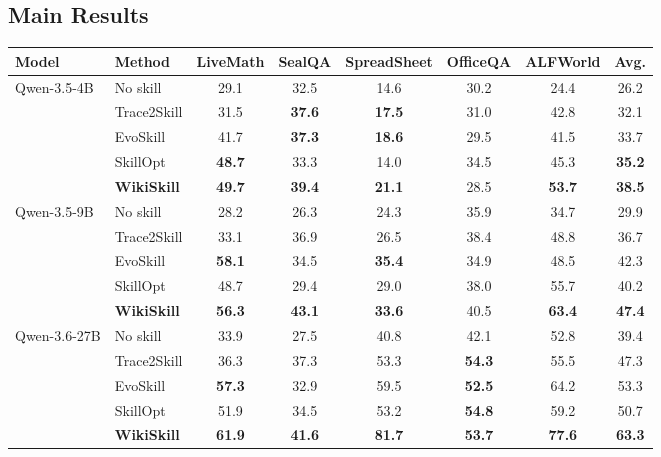 \documentclass[11pt, a4paper, copyright, gr]{google}
\newcommand{\methodcolor}[1]{\cellcolor[HTML]{FDE293}#1}
\begin{document}
\subsection{Main Results}
\label{sec:results}

\begin{table}[t]
\centering
\small
\renewcommand{\tabcolsep}{1.8mm}
\begin{tabular}{llccccc|c}
\toprule
\textbf{Model} & \textbf{Method} & \textbf{LiveMath} & \textbf{SealQA} & \textbf{SpreadSheet} & \textbf{OfficeQA} & \textbf{ALFWorld} & \textbf{Avg.} \\
\midrule
\multirow{5}{*}{Qwen-3.5-4B} & No skill & 29.1 & 32.5 & 14.6 & 30.2 & 24.4 & 26.2 \\
 & Trace2Skill & 31.5 & \textbf{37.6} & \textbf{17.5} & 31.0 & 42.8 & 32.1 \\
 & EvoSkill & 41.7 & \textbf{37.3} & \textbf{18.6} & 29.5 & 41.5 & 33.7 \\
 & SkillOpt & \textbf{48.7} & 33.3 & 14.0 & 34.5 & 45.3 & \textbf{35.2} \\
 & \methodcolor{\textbf{WikiSkill}} & \methodcolor{\textbf{49.7}} & \methodcolor{\textbf{39.4}} & \methodcolor{\textbf{21.1}} & \methodcolor{28.5} & \methodcolor{\textbf{53.7}} & \methodcolor{\textbf{38.5}} \\
\midrule
\multirow{5}{*}{Qwen-3.5-9B} & No skill & 28.2 & 26.3 & 24.3 & 35.9 & 34.7 & 29.9 \\
 & Trace2Skill & 33.1 & 36.9 & 26.5 & 38.4 & 48.8 & 36.7 \\
 & EvoSkill & \textbf{58.1} & 34.5 & \textbf{35.4} & 34.9 & 48.5 & 42.3 \\
 & SkillOpt & 48.7 & 29.4 & 29.0 & 38.0 & 55.7 & 40.2 \\
 & \methodcolor{\textbf{WikiSkill}} & \methodcolor{\textbf{56.3}} & \methodcolor{\textbf{43.1}} & \methodcolor{\textbf{33.6}} & \methodcolor{40.5} & \methodcolor{\textbf{63.4}} & \methodcolor{\textbf{47.4}} \\
\midrule
\multirow{5}{*}{Qwen-3.6-27B} & No skill & 33.9 & 27.5 & 40.8 & 42.1 & 52.8 & 39.4 \\
 & Trace2Skill & 36.3 & 37.3 & 53.3 & \textbf{54.3} & 55.5 & 47.3 \\
 & EvoSkill & \textbf{57.3} & 32.9 & 59.5 & \textbf{52.5} & 64.2 & 53.3 \\
 & SkillOpt & 51.9 & 34.5 & 53.2 & \textbf{54.8} & 59.2 & 50.7 \\
 & \methodcolor{\textbf{WikiSkill}} & \methodcolor{\textbf{61.9}} & \methodcolor{\textbf{41.6}} & \methodcolor{\textbf{81.7}} & \methodcolor{\textbf{53.7}} & \methodcolor{\textbf{77.6}} & \methodcolor{\textbf{63.3}} \\

\end{tabular}
\end{table}
\end{document}
